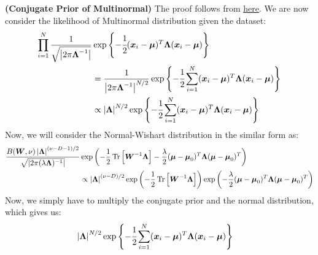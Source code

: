 \begin{remark}{\textbf{(Conjugate Prior of Multinormal)}}
    The proof follows from \href{https://stats.stackexchange.com/questions/153241/derivation-of-normal-wishart-posterior}{here}. We are now consider the likelihood of Multinormal distribution given the dataset:
    \begin{equation*}
    \begin{aligned}
        \prod^N_{i=1} \frac{1}{\sqrt{\left| 2\pi \boldsymbol \Lambda^{-1} \right|}}&\exp\left\{ -\cfrac{1}{2}(\boldsymbol x_i-\boldsymbol \mu)^T\boldsymbol \Lambda(\boldsymbol x_i-\boldsymbol \mu) \right\} \\
        &= \frac{1}{\left| 2\pi\boldsymbol \Lambda^{-1} \right|^{N/2}} \exp\left\{ -\cfrac{1}{2}\sum^N_{i=1}(\boldsymbol x_i-\boldsymbol \mu)^T\boldsymbol \Lambda(\boldsymbol x_i-\boldsymbol \mu) \right\} \\
        &\propto \left| \boldsymbol \Lambda \right|^{N/2} \exp\left\{ -\cfrac{1}{2}\sum^N_{i=1}(\boldsymbol x_i-\boldsymbol \mu)^T\boldsymbol \Lambda(\boldsymbol x_i-\boldsymbol \mu) \right\} \\
    \end{aligned}
    \end{equation*}
    Now, we will consider the Normal-Wishart distribution in the similar form as:
    \begin{equation*}
    \begin{aligned}
        \frac{B(\boldsymbol W, \nu)\left| \boldsymbol \Lambda \right|^{(\nu-D-1)/2}}{\sqrt{\left| 2\pi (\lambda\boldsymbol \Lambda)^{-1} \right|}}&\exp\left( -\frac{1}{2}\operatorname{Tr}\Big[\boldsymbol W^{-1}\boldsymbol \Lambda \Big] - \frac{\lambda}{2} (\boldsymbol \mu-\boldsymbol \mu_0)^T\boldsymbol \Lambda (\boldsymbol \mu-\boldsymbol \mu_0)^T \right) \\
        &\propto \left| \boldsymbol \Lambda \right|^{(\nu-D)/2}\exp\left( -\frac{1}{2}\operatorname{Tr}\Big[\boldsymbol W^{-1}\boldsymbol \Lambda \Big] \right)  \exp\left( -\frac{\lambda}{2} (\boldsymbol \mu-\boldsymbol \mu_0)^T\boldsymbol \Lambda (\boldsymbol \mu-\boldsymbol \mu_0)^T \right) \\
    \end{aligned}
    \end{equation*}
    Now, we simply have to multiply the conjugate prior and the normal distribution, which gives us:
    \begin{equation*}
    \begin{aligned}
        &\begin{aligned}[t]
            \abs{\boldsymbol \Lambda}^{N/2} &\exp\brackc{-\cfrac{1}{2}\sum^N_{i=1}(\boldsymbol x_i-\boldsymbol \mu)^T\boldsymbol \Lambda(\boldsymbol x_i-\boldsymbol \mu)} \\

\end{aligned}
\end{aligned}
\end{equation*}
\end{remark}
